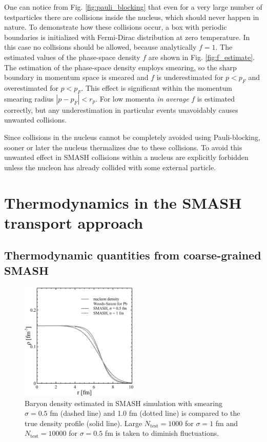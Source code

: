 One can notice from Fig. \ref{fig:pauli_blocking} that even for a very large
number of testparticles there are collisions inside the nucleus, which should
never happen in nature.  To demonstrate how these collisions occur, a box with
periodic boundaries is initialized with Fermi-Dirac distribution at zero
temperature. In this case no collisions should be allowed, because analytically
$\mathit{f} = 1$. The estimated values of the phase-space density $\mathit{f}$
are shown in Fig. \ref{fig:f_estimate}. The estimation of the phase-space
density employs smearing, so the sharp boundary in momentum space is smeared
and $\mathit{f}$ is underestimated for $p < p_F$ and overestimated for $p <
p_F$. This effect is significant within the momentum smearing radius $|p - p_F|
< r_p$.  For low momenta \emph{in average} $\mathit{f}$ is estimated correctly,
but any underestimation in particular events unavoidably causes unwanted collisions.

Since collisions in the nucleus cannot be completely avoided using Pauli-blocking,
sooner or later the nucleus thermalizes due to these collisions. To avoid this unwanted effect
in SMASH collisions within a nucleus are explicitly forbidden unless the nucleon
has already collided with some external particle.


\section{Thermodynamics in the SMASH transport approach} \label{sec:thermodynamics}

\subsection{Thermodynamic quantities from coarse-grained SMASH}

\begin{figure}
  \includegraphics[width=0.5\textwidth]{plots/smash/thermodynamics/density_smearing.pdf}
  \caption{Baryon density estimated in SMASH simulation with smearing $\sigma =
           0.5$ fm (dashed line) and 1.0 fm (dotted line) is compared to the true density
           profile (solid line). Large $N_\text{test} = 1000$ for $\sigma = 1$ fm and
           $N_\text{test} = 10000$ for $\sigma = 0.5$ fm is taken to diminish
           fluctuations.}
  \label{fig:density:smear}
\end{figure}

